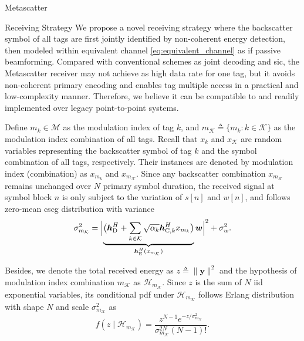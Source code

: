 \documentclass[journal]{IEEEtran}
\begin{document}
\begin{section}{Metascatter}
	\begin{subsection}{Receiving Strategy}
		We propose a novel receiving strategy where the backscatter symbol of all tags are first jointly identified by non-coherent energy detection, then modeled within equivalent channel \eqref{eq:equivalent_channel} as if passive beamforming.
		Compared with conventional schemes as joint decoding and \gls{sic}, the Metascatter receiver may not achieve as high data rate for one tag, but it avoids non-coherent primary encoding and enables tag multiple access in a practical and low-complexity manner.
		Therefore, we believe it can be compatible to and readily implemented over legacy point-to-point systems.

		Define $m_k \in \mathcal{M}$ as the modulation index of tag $k$, and $m_{\mathcal{K}} \triangleq \{m_k: k \in \mathcal{K}\}$ as the modulation index combination of all tags.
		Recall that $x_k$ and $x_{\mathcal{K}}$ are random variables representing the backscatter symbol of tag $k$ and the symbol combination of all tags, respectively.
		Their instances are denoted by modulation index (combination) as $x_{m_k}$ and $x_{m_\mathcal{K}}$.
		Since any backscatter combination $x_{m_\mathcal{K}}$ remains unchanged over $N$ primary symbol duration, the received signal at symbol block $n$ is only subject to the variation of $s[n]$ and $w[n]$, and follows zero-mean \gls{cscg} distribution with variance
		\begin{equation}
			\sigma_{m_{\mathcal{K}}}^2 = \Bigl\lvert \underbrace{\bigl(\boldsymbol{h}_{\mathrm{D}}^H + \sum_{k \in \mathcal{K}} \sqrt{\alpha_k} \boldsymbol{h}_{\mathrm{C},k}^H x_{m_k}\bigr)}_{\boldsymbol{h}_{\mathrm{E}}^H(x_{m_{\mathcal{K}}})} \boldsymbol{w} \Bigr\rvert^2 + \sigma_w^2.
			\label{eq:receive_variance}
		\end{equation}

		Besides, we denote the total received energy as $z \triangleq \lVert \boldsymbol{y} \rVert^2$ and the hypothesis of modulation index combination $m_{\mathcal{K}}$ as $\mathcal{H}_{m_{\mathcal{K}}}$.
		Since $z$ is the sum of $N$ \gls{iid} exponential variables, its conditional \gls{pdf} under $\mathcal{H}_{m_{\mathcal{K}}}$ follows Erlang distribution with shape $N$ and scale $\sigma_{m_{\mathcal{K}}}^2$ as
		\begin{equation}
			f(z \mid \mathcal{H}_{m_{\mathcal{K}}}) = \frac{z^{N-1} e^{-z/\sigma_{m_{\mathcal{K}}}^2}}{\sigma_{m_{\mathcal{K}}}^{2N} (N-1)!}.
			\label{eq:energy_distribution}
		\end{equation}


\end{subsection}
\end{section}
\end{document}
